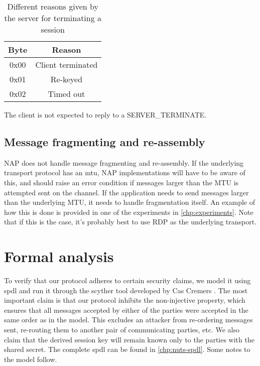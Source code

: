 \begin{table}[ht!]
\centering
    \begin{tabular}{| c | c |}
    \hline
    \textbf{Byte} & \textbf{Reason} \\ \hline
    0x00 & Client terminated \\ \hline
    0x01 & Re-keyed \\ \hline
    0x02 & Timed out \\ \hline
    \end{tabular}
    \caption{Different reasons given by the server for terminating a session}\label{tab:terminate-reasons}
\end{table}

The client is not expected to reply to a SERVER\_TERMINATE.


    \subsection{Message fragmenting and re-assembly}

NAP does not handle message fragmenting and re-assembly. If the underlying transport protocol has an \gls{mtu}, NAP implementations will have to be aware of this, and should raise an error condition if messages larger than the MTU is attempted sent on the channel. If the application needs to send messages larger than the underlying MTU, it needs to handle fragmentation itself. An example of how this is done is provided in one of the experiments in \autoref{chp:experiments}. Note that if this is the case, it's probably best to use RDP as the underlying transport.


\section{Formal analysis}\label{sec:formal_analysis}

To verify that our protocol adheres to certain security claims, we model it using \gls{spdl} and run it through the \gls{scyther} tool developed by Cas Cremers \cite{scyther}. The most important claim is that our protocol inhibits the non-injective property, which ensures that all messages accepted by either of the parties were accepted in the same order as in the model. This excludes an attacker from re-ordering messages sent, re-routing them to another pair of communicating parties, etc. We also claim that the derived session key will remain known only to the parties with the shared secret. The complete \gls{spdl} can be found in \autoref{chp:nuts-spdl}. Some notes to the model follow.

